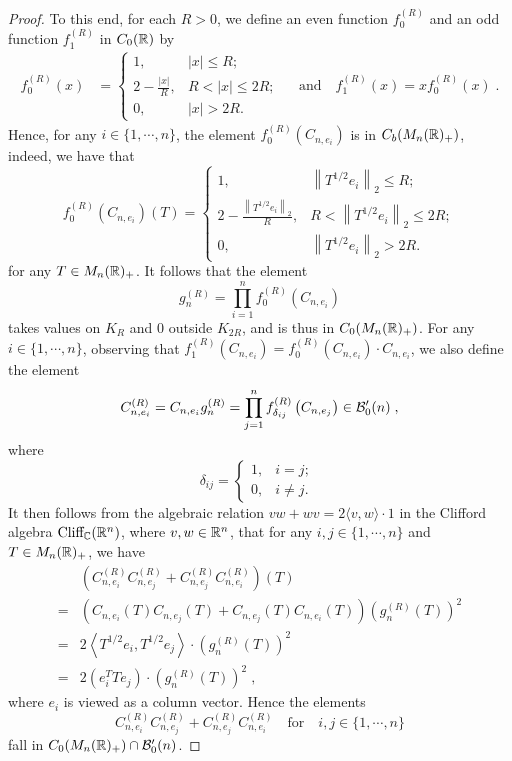 \documentclass[11pt]{article}
\theoremstyle{definition}
\theoremstyle{plain}
\def\Cl{\textup{Cliff}_{\IC}}
\begin{document}
\begin{proof}
To this end, for each $R>0$, we define an even function $f_{0}^{(R)}$ and an odd function $f_{1}^{(R)}$ in $C_0(\mathbb R)$ by
\begin{align*}
f_{0}^{(R)} (x) &= 
\begin{cases}
1 , & |x| \leq R;\\
2 - \frac{|x|}{R}, & R < |x| \leq 2R;\\
0, & |x| > 2R.
\end{cases}\; \quad \text{and} \quad f_{1}^{(R)} (x) = x f_{0}^{(R)} (x) \; .\end{align*}
Hence, for any $i\in\{1,\cdots,n\}$, the element $f_0^{(R)}(C_{n,e_i})$ is in $C_b(M_n(\mathbb R)_+)$, indeed, we have that
\[f_{0}^{(R)} \left(C_{n, e_i}\right) (T) = \begin{cases}
1 , & \left\| T^{1/2} e_i \right\|_2 \leq R; \\
2 - \frac{\left\| T^{1/2} e_i \right\|_2}{R}, & R < \left\| T^{1/2} e_i \right\|_2 \leq 2R; \\
0, & \left\| T^{1/2} e_i \right\|_2 > 2R.\end{cases}\]
for any $T\in M_n(\mathbb R)_+$. It follows that the element
$$g^{(R)}_n=\prod_{i=1}^{n} f_0^{(R)}(C_{n, e_i})$$
takes values on $K_R$ and $0$ outside $K_{2R}$, and is thus in $C_0(M_n(\mathbb R)_+)$. For any $i\in\{1,\cdots,n\}$, observing that $f_1^{(R)}(C_{n,e_i})=f_0^{(R)}(C_{n,e_i})\cdot C_{n,e_i}$, we also define the element
\[C_{n, e_i}^{(R)} = C_{n, e_i} g^{(R)}_n = \prod_{j = 1}^{n} f_{\delta_{ij}}^{(R)} \left(C_{n, e_j}\right) \in\mathcal B_0'(n) \; ,\]
where 
\[\delta_{ij} = \begin{cases}1, & i = j; \\
0, & i \not= j.\end{cases}\; \]
It then follows from the algebraic relation $vw + wv = 2 \langle v, w \rangle \cdot 1$ in the Clifford algebra $\Cl(\IR^n)$, where $v, w \in \mathbb R^n$, that for any $i,j \in \{1, \cdots, n\}$ and $T \in M_n(\mathbb R)_{+}$, we have
\begin{align*}
&\left( C_{n, e_{i}}^{(R)} C_{n, e_{j}}^{(R)} + C_{n, e_{j}}^{(R)} C_{n, e_{i}}^{(R)} \right) (T) \\
=& \left(C_{n, e_{i}} (T)C_{n, e_{j}}(T) + C_{n, e_{j}}(T) C_{n, e_{i}} (T) \right) \left(g^{(R)}_n (T)\right)^2 \\
=& 2 \left\langle T^{1/2} e_{i} , T^{1/2} e_{j} \right\rangle \cdot \left(g^{(R)}_n (T)\right)^2 \\
=& 2 \left( e_{i}^T T e_{j} \right) \cdot \left( g^{(R)}_n (T) \right)^2 \; ,
\end{align*}
where $e_i$ is viewed as a column vector. Hence the elements
\[C_{n, e_{i}}^{(R)} C_{n, e_{j}}^{(R)} + C_{n, e_{j}}^{(R)} C_{n, e_{i}}^{(R)} \quad \text{for}\quad i,j \in \{1,\cdots,n\}\]
fall in $C_0(M_n(\mathbb R)_{+}) \cap \mathcal B_0'(n)$. 


\end{proof}
\end{document}

